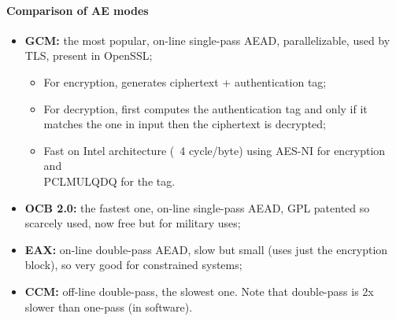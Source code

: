 \paragraph{Comparison of AE modes}
\begin{itemize}
	\item \textbf{GCM:} the most popular, on-line single-pass AEAD, parallelizable, used by TLS, present in OpenSSL;
	      \begin{itemize}
		      \item For encryption, generates ciphertext + authentication tag;
		      \item For decryption, first computes the authentication tag and only if it matches the one in input then the ciphertext is decrypted;
		      \item Fast on Intel architecture (~4 cycle/byte) using AES-NI for encryption and \\
		            PCLMULQDQ for the tag.
	      \end{itemize}
	\item \textbf{OCB 2.0:} the fastest one, on-line single-pass AEAD, GPL patented so scarcely used, now free but for military uses;
	\item \textbf{EAX:} on-line double-pass AEAD, slow but small (uses just the encryption block), so very good for constrained systems;
	\item \textbf{CCM:} off-line double-pass, the slowest one. Note that double-pass is 2x slower than one-pass (in software).
\end{itemize}

